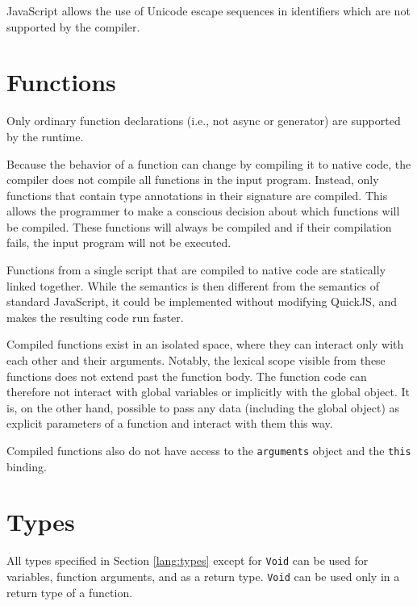 JavaScript allows the use of Unicode escape sequences in identifiers which are not supported by the compiler.



\section{Functions}

Only ordinary function declarations (i.e., not async or generator) are supported by the runtime.

Because the behavior of a function can change by compiling it to native code, the compiler does not compile all functions in the input program. Instead, only functions that contain type annotations in their signature are compiled. This allows the programmer to make a conscious decision about which functions will be compiled. These functions will always be compiled and if their compilation fails, the input program will not be executed.

Functions from a single script that are compiled to native code are statically linked together. While the semantics is then different from the semantics of standard JavaScript, it could be implemented without modifying QuickJS, and makes the resulting code run faster.

Compiled functions exist in an isolated space, where they can interact only with each other and their arguments. Notably, the lexical scope visible from these functions does not extend past the function body. The function code can therefore not interact with global variables or implicitly with the global object. It is, on the other hand, possible to pass any data (including the global object) as explicit parameters of a function and interact with them this way.

Compiled functions also do not have access to the \texttt{arguments} object and the \texttt{this} binding.


\section{Types}

All types specified in Section \ref{lang:types} except for \texttt{Void} can be used for variables, function arguments, and as a return type. \texttt{Void} can be used only in a return type of a function.


